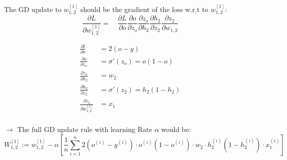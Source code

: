 \begin{answer}
    
    The GD update to \(w_{1,2}^{[1]}\) should be the gradient of the loss w.r.t to \(w_{1,2}^{[1]}\):
\[ \frac{\partial L}{\partial w_{1,2}^{[1]}} = \quad \frac{\partial L}{\partial o} \frac{\partial o}{\partial z_o} \frac{\partial z_o}{\partial h_2} \frac{\partial h_2}{\partial z_2} \frac{\partial z_2}{\partial w_{1,2}} \]

\begin{align*}
    \frac{\partial l}{\partial o} &= 2(o - y) \\
    \frac{\partial o}{\partial z_o} &= \sigma'(z_o) = o(1-o) \\
    \frac{\partial z_o}{\partial h_2} &= w^{}_{2} \\
    \frac{\partial h_2}{\partial z_2} &= \sigma'(z_2) = h_2(1-h_2) \\
    \frac{\partial z_2}{\partial w^{[1]}_{1,2}} &= x_1 \\
\end{align*}

\(\rightarrow\) The full GD update rule with learning Rate \(\alpha\) would be:
\[ W^{[1]}_{1,2} := w^{[1]}_{1,2} - \alpha \left[ \frac{1}{n} \sum_{i=1}^n 2(o^{(i)}-y^{(i)}) \cdot o^{(i)}(1-o^{(i)}) \cdot w^{}_{2} \cdot h_2^{(i)}(1-h_2^{(i)}) \cdot x_1^{(i)} \right] \]

\end{answer}

